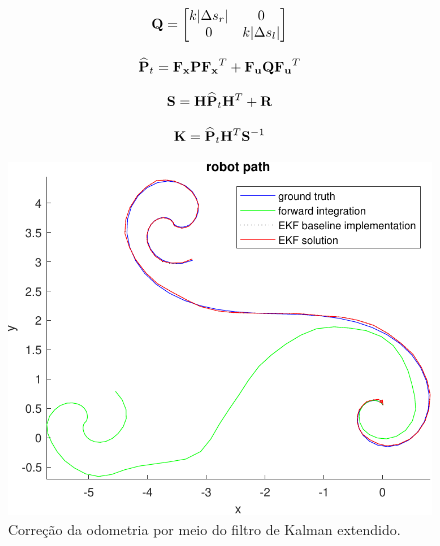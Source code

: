 \begin{equation}\label{eq:Q}
	\mathbf{Q} = \begin{bmatrix}
		k|\Delta s_r| & 0 \\
		0 & k|\Delta s_l|
	\end{bmatrix}
\end{equation}

\begin{equation}\label{eq:Ppriori}
	\widehat{\mathbf{P}}_t = \mathbf{F_x}\mathbf{P}\mathbf{F_x}^T + \mathbf{F_u}\mathbf{Q}\mathbf{F_u}^T 
\end{equation}

\begin{equation}\label{eq:S}
	\mathbf{S} = \mathbf{H}\widehat{\mathbf{P}}_t\mathbf{H}^T + \mathbf{R}
\end{equation}

\begin{equation}\label{eq:K}
	\mathbf{K} = \widehat{\mathbf{P}}_t\mathbf{H}^T\mathbf{S}^{-1}
\end{equation}


\begin{figure}[H]
	\centering
	\includegraphics[width=0.75\linewidth]{img/odometry_filtered}
	\caption{Correção da odometria por meio do filtro de Kalman extendido.}
	\label{fig:odometry_filtered}
\end{figure}

